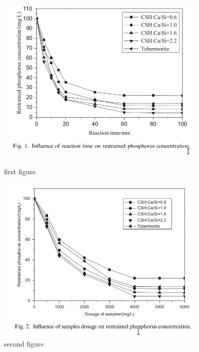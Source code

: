 \documentclass[11pt]{article}
\begin{document}
\begin{figure}
    \centering
    \begin{minipage}{0.45\textwidth}
        \centering
        \includegraphics[width=0.9\textwidth]{fig.1.png} %
        \caption{first figure}
    \end{minipage}\hfill
    \begin{minipage}{0.45\textwidth}
        \centering
        \includegraphics[width=0.9\textwidth]{fig.2.png} %
        \caption{second figure}
    \end{minipage}
\end{figure}
\end{document}
